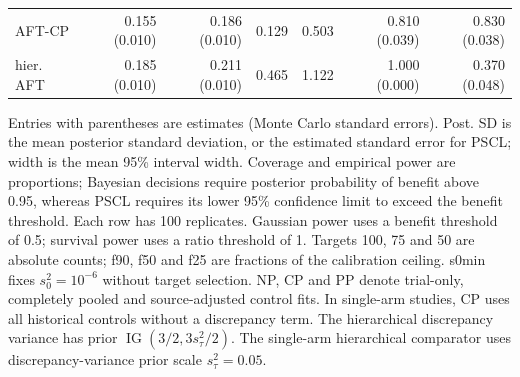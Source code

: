\begin{landscape}
\begin{longtable}{lrrrrrr}
AFT-CP & 0.155 (0.010) & 0.186 (0.010) & 0.129 & 0.503 & 0.810 (0.039) & 0.830 (0.038) \\
hier. AFT & 0.185 (0.010) & 0.211 (0.010) & 0.465 & 1.122 & 1.000 (0.000) & 0.370 (0.048) \\
\end{longtable}
\noindent\begin{minipage}{\linewidth}\footnotesize Entries with parentheses are estimates (Monte Carlo standard errors). Post. SD is the mean posterior standard deviation, or the estimated standard error for PSCL; width is the mean 95\% interval width. Coverage and empirical power are proportions; Bayesian decisions require posterior probability of benefit above 0.95, whereas PSCL requires its lower 95\% confidence limit to exceed the benefit threshold. Each row has 100 replicates. Gaussian power uses a benefit threshold of 0.5; survival power uses a ratio threshold of 1. Targets 100, 75 and 50 are absolute counts; f90, f50 and f25 are fractions of the calibration ceiling. s0min fixes $s_0^2=10^{-6}$ without target selection. NP, CP and PP denote trial-only, completely pooled and source-adjusted control fits. In single-arm studies, CP uses all historical controls without a discrepancy term. The hierarchical discrepancy variance has prior $\operatorname{IG}(3/2,3s_\tau^2/2)$. The single-arm hierarchical comparator uses discrepancy-variance prior scale $s_\tau^2=0.05$.\end{minipage}
\endgroup
\end{landscape}
